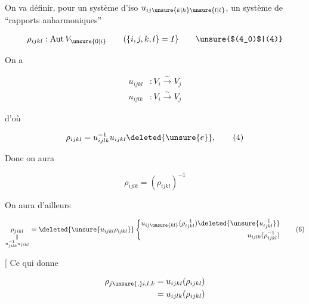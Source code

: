 
On va définir, pour un système d'iso $u_{ij\unsure{k|h}\unsure{l|\ell}}$, un système de ``rapports anharmoniques''

\[
\rho_{ijkl}:\operatorname{Aut}V_{\unsure{0|i}}\qquad(\{i,j,k,l\}=I\}\tag*{\unsure{$(4_0)$|(4)}}
\]

On a

\[
\begin{aligned}
u_{ijkl}&: V_i\xrightarrow{\sim}V_j\\
u_{ijlk}&: V_i\xrightarrow{\sim}V_j
\end{aligned}
\]


d'où

\[
 \rho_{ijkl}=u_{ijlk}^{-1}u_{ijkl}\deleted{\unsure{e}},\tag*{(4)}
\]


Donc on aura

\[
 \rho_{ijlk}=(\rho_{ijkl})^{-1}\tag*{(5)}
\]


On aura d'ailleurs

\[
\underset{\substack{\Vert\\u_{jilk}^{-1}u_{jikl}}}{\rho_{jikl}}=
\deleted{\unsure{u_{ijkl}\rho_{ijkl}}}
\left\{\begin{aligned}
 u_{ij\unsure{kl}}(\rho_{ijkl}^{-1})\deleted{\unsure{u_{ijkl}^{-1}}}\\
 u_{ijlk}(\rho_{ijkl}^{-1})
\end{aligned}\right.\tag*{(6)}
\]


[ Ce qui donne

\[
\begin{aligned}
\rho_{j\unsure{,}i,l,k}&=u_{ijkl}(\rho_{ijkl})\\
 &=u_{ijlk}(\rho_{ijkl})
\end{aligned}
\]


